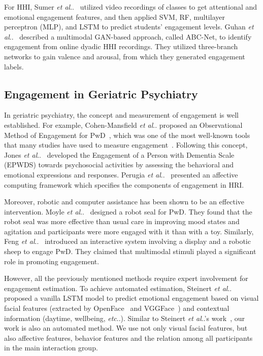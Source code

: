 \documentclass[VANCOUVER,STIX1COL]{WileyNJD-v2}
\makeatletter
\DeclareRobustCommand\onedot{\futurelet\@let@token\@onedot}
\def\@onedot{\ifx\@let@token.\else.\null\fi\xspace}
\def\etc{\emph{etc}\onedot}
\def\etal{\emph{et al}\onedot}
\makeatother
\begin{document}
For HHI, Sumer \etal~\cite{Sumer2021Multimodal} utilized video recordings of classes to get attentional and emotional engagement features, and then applied SVM, RF, multilayer perceptron (MLP), and LSTM to predict students' engagement levels. Guhan \etal~\cite{Guhan2020ABCNet} described a multimodal GAN-based approach, called ABC-Net, to identify engagement from online dyadic HHI recordings. They utilized three-branch networks to gain valence and arousal, from which they generated engagement labels.

\subsection{Engagement in Geriatric Psychiatry}
\label{subs:Engagement_for_the_Elderly}

In geriatric psychiatry, the concept and measurement of engagement is well established. For example, Cohen-Mansfield \etal proposed an Observational Method of Engagement for PwD~\cite{Cohen2009Engagement}, which was one of the most well-known tools that many studies have used to measure engagement~\cite{Trahan2014Systematic}. Following this concept, Jones \etal~\cite{Jones2018Engagement} developed the Engagement of a Person with Dementia Scale (EPWDS) towards psychosocial activities by assessing the behavioral and emotional expressions and responses. Perugia \etal~\cite{Perugia2020ENGAGEDEM} presented an affective computing framework which specifies the components of engagement in HRI.

Moreover, robotic and computer assistance has been shown to be an effective intervention. Moyle \etal~\cite{Moyle2017Use} designed a robot seal for PwD. They found that the robot seal was more effective than usual care in improving mood states and agitation and participants were more engaged with it than with a toy. Similarly, Feng \etal~\cite{Feng2021ContextEnhanced} introduced an interactive system involving a display and a robotic sheep to engage PwD. They claimed that multimodal stimuli played a significant role in promoting engagement.

However, all the previously mentioned methods require expert involvement for engagement estimation. To achieve automated estimation, Steinert \etal~\cite{Steinert2020Engagement} proposed a vanilla LSTM model to predict emotional engagement based on visual facial features (extracted by OpenFace~\cite{Baltrusaitis2018OpenFace} and VGGFace~\cite{Parkhi2015Deep}) and contextual information (daytime, wellbeing, \etc). Similar to Steinert \etal's work~\cite{Steinert2020Engagement}, our work is also an automated method. We use not only visual facial features, but also affective features, behavior features and the relation among all participants in the main interaction group.
\end{document}

